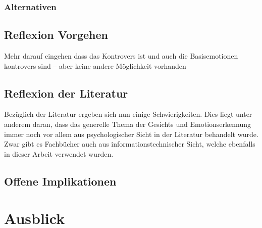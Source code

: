 \documentclass[12pt, a4paper]{scrbook}
\begin{document}
\subsection{Alternativen}

\section{Reflexion Vorgehen}
Mehr darauf eingehen dass das Kontrovers ist und auch die Basisemotionen kontrovers sind --  aber keine andere Möglichkeit vorhanden 

\section{Reflexion der Literatur}
Bezüglich der Literatur ergeben sich nun einige Schwierigkeiten. Dies liegt unter anderem daran, dass das generelle Thema der Gesichts und Emotionserkennung immer noch vor allem aus
psychologischer Sicht in der Literatur behandelt wurde. Zwar gibt es Fachbücher auch aus informationstechnischer Sicht, welche ebenfalls in dieser Arbeit verwendet wurden.

\section{Offene Implikationen}

\chapter{Ausblick}
\end{document}

